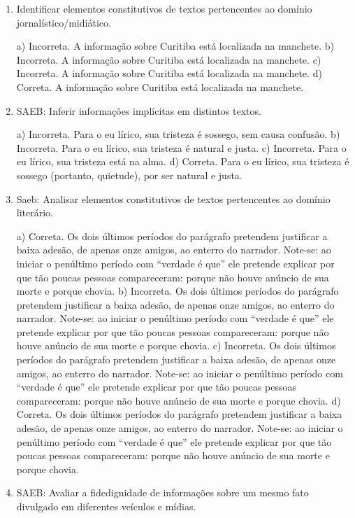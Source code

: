 \begin{enumerate}
	\item
Identificar elementos constitutivos de textos pertencentes ao domínio
jornalístico/midiático.

a) Incorreta. A informação sobre Curitiba está localizada na manchete.
b) Incorreta. A informação sobre Curitiba está localizada na manchete.
c) Incorreta. A informação sobre Curitiba está localizada na manchete.
d) Correta. A informação sobre Curitiba está localizada na manchete.

	\item
SAEB: Inferir informações implícitas em distintos textos.

a) Incorreta. Para o eu lírico, sua tristeza é sossego, sem causa confusão.
b) Incorreta. Para o eu lírico, sua tristeza é natural e justa. 
c) Incorreta. Para o eu lírico, sua tristeza está na alma.
d) Correta. Para o eu lírico, sua tristeza é sossego (portanto, quietude),
por ser natural e justa.

	\item
Saeb: Analisar elementos constitutivos de textos pertencentes ao domínio literário.

a) Correta. Os dois últimos períodos do parágrafo pretendem justificar a baixa
adesão, de apenas onze amigos, ao enterro do narrador. Note-se: ao iniciar o 
penúltimo período com ``verdade é que'' ele pretende explicar por que tão 
poucas pessoas compareceram: porque não houve anúncio de sua morte e porque chovia.
b) Incorreta. Os dois últimos períodos do parágrafo pretendem justificar a baixa
adesão, de apenas onze amigos, ao enterro do narrador. Note-se: ao iniciar o 
penúltimo período com ``verdade é que'' ele pretende explicar por que tão 
poucas pessoas compareceram: porque não houve anúncio de sua morte e porque chovia.
c) Incorreta. Os dois últimos períodos do parágrafo pretendem justificar a baixa
adesão, de apenas onze amigos, ao enterro do narrador. Note-se: ao iniciar o 
penúltimo período com ``verdade é que'' ele pretende explicar por que tão 
poucas pessoas compareceram: porque não houve anúncio de sua morte e porque chovia.
d) Correta. Os dois últimos períodos do parágrafo pretendem justificar a baixa
adesão, de apenas onze amigos, ao enterro do narrador. Note-se: ao iniciar o 
penúltimo período com ``verdade é que'' ele pretende explicar por que tão 
poucas pessoas compareceram: porque não houve anúncio de sua morte e porque chovia.
	
	\item
SAEB: Avaliar a fidedignidade de informações sobre um mesmo fato
divulgado em diferentes veículos e mídias.


\end{enumerate}
